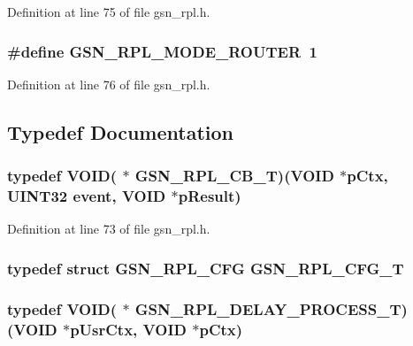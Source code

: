 Definition at line 75 of file gsn\_\-rpl.h.

\hypertarget{a00579_a384e139c7ef24432a4d438ba9424379d}{
\subsubsection[{GSN\_\-RPL\_\-MODE\_\-ROUTER}]{\setlength{\rightskip}{0pt plus 5cm}\#define GSN\_\-RPL\_\-MODE\_\-ROUTER~1}}
\label{a00579_a384e139c7ef24432a4d438ba9424379d}


Definition at line 76 of file gsn\_\-rpl.h.



\subsection{Typedef Documentation}
\hypertarget{a00579_aed305ee504daf71b35d8db4dfd6d3de3}{
\subsubsection[{GSN\_\-RPL\_\-CB\_\-T}]{\setlength{\rightskip}{0pt plus 5cm}typedef VOID( $\ast$ {\bf GSN\_\-RPL\_\-CB\_\-T})(VOID $\ast$pCtx, {\bf UINT32} event, VOID $\ast$pResult)}}
\label{a00579_aed305ee504daf71b35d8db4dfd6d3de3}


Definition at line 73 of file gsn\_\-rpl.h.

\hypertarget{a00579_a5363c16d8a8bbc0dd0ec573805d09841}{
\subsubsection[{GSN\_\-RPL\_\-CFG\_\-T}]{\setlength{\rightskip}{0pt plus 5cm}typedef struct {\bf GSN\_\-RPL\_\-CFG} {\bf GSN\_\-RPL\_\-CFG\_\-T}}}
\label{a00579_a5363c16d8a8bbc0dd0ec573805d09841}
\hypertarget{a00579_af0ccdfb14b5152fb661e14482e16d4e7}{
\subsubsection[{GSN\_\-RPL\_\-DELAY\_\-PROCESS\_\-T}]{\setlength{\rightskip}{0pt plus 5cm}typedef VOID( $\ast$ {\bf GSN\_\-RPL\_\-DELAY\_\-PROCESS\_\-T})(VOID $\ast$pUsrCtx, VOID $\ast$pCtx)}}
\label{a00579_af0ccdfb14b5152fb661e14482e16d4e7}



